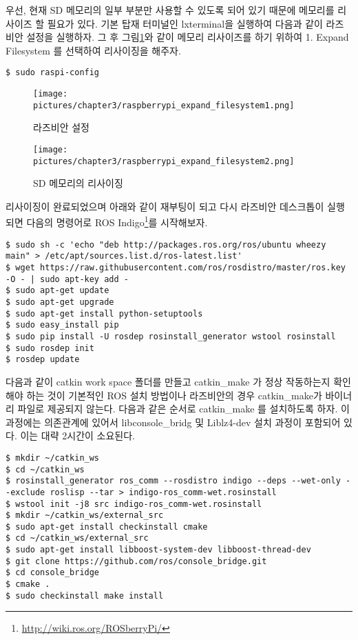 우선, 현재 SD 메모리의 일부 부분만 사용할 수 있도록 되어 있기 때문에 메모리를 리사이즈 할 필요가 있다. 기본 탑재 터미널인 lxterminal을 실행하여 다음과 같이 라즈비안 설정을 실행하자. 그 후 그림\ref{fig:raspberrypi_expand_filesystem1}와 같이 메모리 리사이즈를 하기 위하여 1. Expand Filesystem 를 선택하여 리사이징을 해주자.

\vspace{\baselineskip}
\begin{lstlisting}[language=ROS]
$ sudo raspi-config
\end{lstlisting}

\begin{figure}[h]
\centering\texttt{[image: pictures/chapter3/raspberrypi\_expand\_filesystem1.png]}
\caption{라즈비안 설정}
\label{fig:raspberrypi_expand_filesystem1}
\end{figure}

\begin{figure}[h]
\centering\texttt{[image: pictures/chapter3/raspberrypi\_expand\_filesystem2.png]}
\caption{SD 메모리의 리사이징}
\label{fig:raspberrypi_expand_filesystem2}
\end{figure}

리사이징이 완료되었으며 아래와 같이 재부팅이 되고 다시 라즈비안 데스크톱이 실행되면 다음의 명령어로 ROS Indigo\footnote{\url{http://wiki.ros.org/ROSberryPi/}}를 시작해보자.

\vspace{\baselineskip}
\begin{lstlisting}[language=ROS]
$ sudo sh -c 'echo "deb http://packages.ros.org/ros/ubuntu wheezy main" > /etc/apt/sources.list.d/ros-latest.list'
$ wget https://raw.githubusercontent.com/ros/rosdistro/master/ros.key -O - | sudo apt-key add -
$ sudo apt-get update
$ sudo apt-get upgrade
$ sudo apt-get install python-setuptools
$ sudo easy_install pip
$ sudo pip install -U rosdep rosinstall_generator wstool rosinstall
$ sudo rosdep init
$ rosdep update
\end{lstlisting}

다음과 같이 catkin work space 폴더를 만들고 catkin\_make 가 정상 작동하는지 확인해야 하는 것이 기본적인 ROS 설치 방법이나 라즈비안의 경우 catkin\_make가 바이너리 파일로 제공되지 않는다. 다음과 같은 순서로 catkin\_make 를 설치하도록 하자. 이 과정에는 의존관계에 있어서 libconsole\_bridg 및 Liblz4-dev 설치 과정이 포함되어 있다. 이는 대략 2시간이 소요된다.

\vspace{\baselineskip}
\vspace{\baselineskip}
\begin{lstlisting}[language=ROS]
$ mkdir ~/catkin_ws
$ cd ~/catkin_ws
$ rosinstall_generator ros_comm --rosdistro indigo --deps --wet-only --exclude roslisp --tar > indigo-ros_comm-wet.rosinstall
$ wstool init -j8 src indigo-ros_comm-wet.rosinstall
$ mkdir ~/catkin_ws/external_src
$ sudo apt-get install checkinstall cmake
$ cd ~/catkin_ws/external_src
$ sudo apt-get install libboost-system-dev libboost-thread-dev
$ git clone https://github.com/ros/console_bridge.git
$ cd console_bridge
$ cmake .
$ sudo checkinstall make install
\end{lstlisting}

